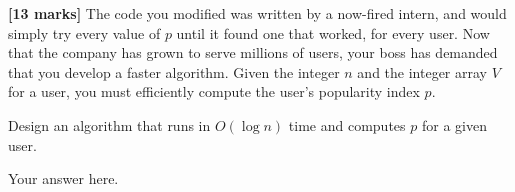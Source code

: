 \documentclass{article}
\begin{document}
\begin{Question}
\begin{Subquestion}
\begin{answer}
\end{answer}
\end{Subquestion}

\begin{Subquestion}
\textbf{[13 marks]} The code you modified was written by a now-fired intern, and would simply try every value of \(p\) until it found one that worked, for every user. Now that the company has grown to serve millions of users, your boss has demanded that you develop a faster algorithm. Given the integer \(n\) and the integer array \(V\) for a user, you must efficiently compute the user's popularity index \(p\). 

Design an algorithm that runs in \(O(\log{n})\) time and computes $p$ for a given user.

\begin{answer}
Your answer here.
\end{answer}
\end{Subquestion}
\end{Question}
\end{document}

